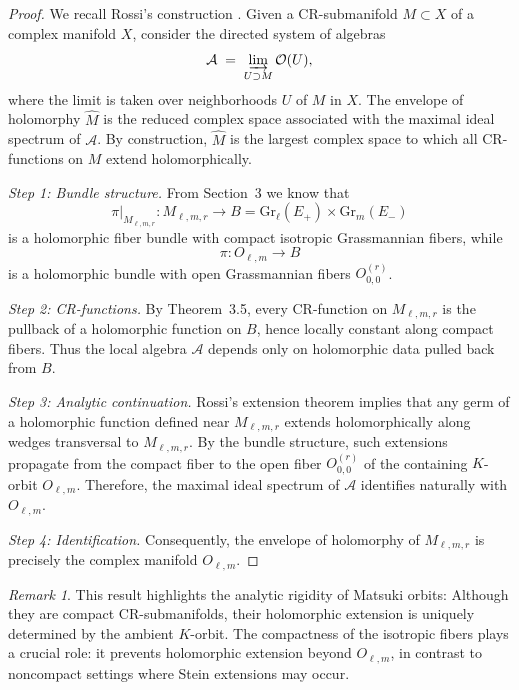 \documentclass[12pt,a4paper]{article}
\theoremstyle{plain}
\theoremstyle{definition}
\theoremstyle{remark}
\newtheorem*{remark}{Remark}
\begin{document}
\begin{proof}
We recall Rossi’s construction \cite{Rossi1965}. 
Given a CR-submanifold $M \subset X$ of a complex manifold $X$, 
consider the directed system of algebras
\[
\mathcal{A} \;=\; \varinjlim_{U \supset M} \mathcal{O}(U),
\]
where the limit is taken over neighborhoods $U$ of $M$ in $X$. 
The envelope of holomorphy $\widehat{M}$ is the reduced complex space 
associated with the maximal ideal spectrum of $\mathcal{A}$. 
By construction, $\widehat{M}$ is the largest complex space to which all 
CR-functions on $M$ extend holomorphically. 

\smallskip
\emph{Step 1: Bundle structure.}  
From Section~3 we know that 
\[
\pi|_{M_{\ell,m,r}} : M_{\ell,m,r} \longrightarrow 
B = \mathrm{Gr}_\ell(E_+) \times \mathrm{Gr}_m(E_-)
\]
is a holomorphic fiber bundle with compact isotropic Grassmannian fibers, 
while 
\[
\pi : O_{\ell,m} \longrightarrow B
\]
is a holomorphic bundle with open Grassmannian fibers $O^{(r)}_{0,0}$. 

\smallskip
\emph{Step 2: CR-functions.}  
By Theorem~3.5, every CR-function on $M_{\ell,m,r}$ is the pullback 
of a holomorphic function on $B$, hence locally constant along compact fibers. 
Thus the local algebra $\mathcal{A}$ depends only on holomorphic data 
pulled back from $B$. 

\smallskip
\emph{Step 3: Analytic continuation.}  
Rossi’s extension theorem implies that any germ of a holomorphic function 
defined near $M_{\ell,m,r}$ extends holomorphically along wedges transversal 
to $M_{\ell,m,r}$. 
By the bundle structure, such extensions propagate from the compact fiber 
to the open fiber $O^{(r)}_{0,0}$ of the containing $K$-orbit $O_{\ell,m}$. 
Therefore, the maximal ideal spectrum of $\mathcal{A}$ identifies naturally 
with $O_{\ell,m}$. 

\smallskip
\emph{Step 4: Identification.}  
Consequently, the envelope of holomorphy of $M_{\ell,m,r}$ is 
precisely the complex manifold $O_{\ell,m}$. 
\end{proof}

\begin{remark}
This result highlights the analytic rigidity of Matsuki orbits: 
Although they are compact CR-submanifolds, their holomorphic extension 
is uniquely determined by the ambient $K$-orbit. 
The compactness of the isotropic fibers plays a crucial role: 
it prevents holomorphic extension beyond $O_{\ell,m}$, in contrast to 
noncompact settings where Stein extensions may occur. 
\end{remark}
\end{document}
